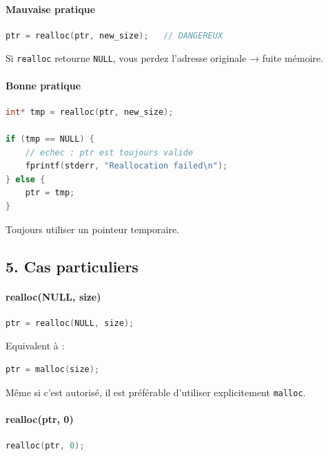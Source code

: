 \paragraph{Mauvaise pratique}

\begin{lstlisting}[language=C]
ptr = realloc(ptr, new_size);   // DANGEREUX
\end{lstlisting}

Si \texttt{realloc} retourne \texttt{NULL},
vous perdez l’adresse originale → fuite mémoire.

\paragraph{Bonne pratique}

\begin{lstlisting}[language=C]
int* tmp = realloc(ptr, new_size);

if (tmp == NULL) {
    // echec : ptr est toujours valide
    fprintf(stderr, "Reallocation failed\n");
} else {
    ptr = tmp;
}
\end{lstlisting}

Toujours utiliser un pointeur temporaire.

\subsection*{5. Cas particuliers}

\paragraph{realloc(NULL, size)}

\begin{lstlisting}[language=C]
ptr = realloc(NULL, size);
\end{lstlisting}

Equivalent à :

\begin{lstlisting}[language=C]
ptr = malloc(size);
\end{lstlisting}

Même si c’est autorisé, il est préférable
d’utiliser explicitement \texttt{malloc}.

\paragraph{realloc(ptr, 0)}

\begin{lstlisting}[language=C]
realloc(ptr, 0);
\end{lstlisting}

